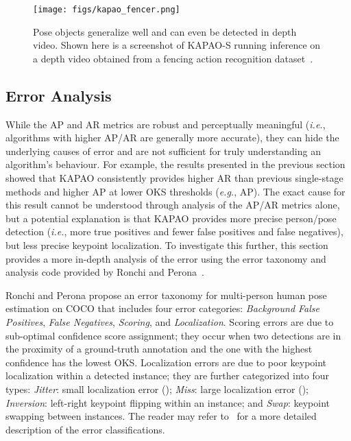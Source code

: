 \documentclass[runningheads]{llncs}
\newcommand{\eg}{\textit{e.g.}}
\newcommand{\ie}{\textit{i.e.}}
\begin{document}
\begin{figure}
\centering
    \texttt{[image: figs/kapao\_fencer.png]}
\caption[KAPAO inference on a depth image.]{Pose objects generalize well and can even be detected in depth video. Shown here is a screenshot of KAPAO-S running inference on a depth video obtained from a fencing action recognition dataset~\cite{app_malawski2016classification, app_zhu2022fencenet}.}
\label{fig:kapao_depth}
\end{figure}

\subsection{Error Analysis}
\label{sec:kapao_error}
While the AP and AR metrics are robust and perceptually meaningful (\ie, algorithms with higher AP/AR are generally more accurate), they can hide the underlying causes of error and are not sufficient for truly understanding an algorithm's behaviour. 
For example, the results presented in the previous section showed that KAPAO consistently provides higher AR than previous single-stage methods and higher AP at lower OKS thresholds (\eg, AP).
The exact cause for this result cannot be understood through analysis of the AP/AR metrics alone, but a potential explanation is that KAPAO provides more precise person/pose detection (\ie, more true positives and fewer false positives and false negatives), but less precise keypoint localization.
To investigate this further, this section provides a more in-depth analysis of the error using the error taxonomy and analysis code provided by Ronchi and Perona~\cite{app_ronchi2017benchmarking}.

Ronchi and Perona propose an error taxonomy for multi-person human pose estimation on COCO that includes four error categories: \textit{Background False Positives}, \textit{False Negatives}, \textit{Scoring}, and \textit{Localization}. Scoring errors are due to sub-optimal confidence score assignment; they occur when two detections are in the proximity of a ground-truth annotation and the one with the highest confidence has the lowest OKS. Localization errors are due to poor keypoint localization within a detected instance; they are further categorized into four types: \textit{Jitter}: small localization error (); \textit{Miss}: large localization error (); \textit{Inversion}: left-right keypoint flipping within an instance; and \textit{Swap}: keypoint swapping between instances. The reader may refer to~\cite{app_ronchi2017benchmarking} for a more detailed description of the error classifications. 
\end{document}
